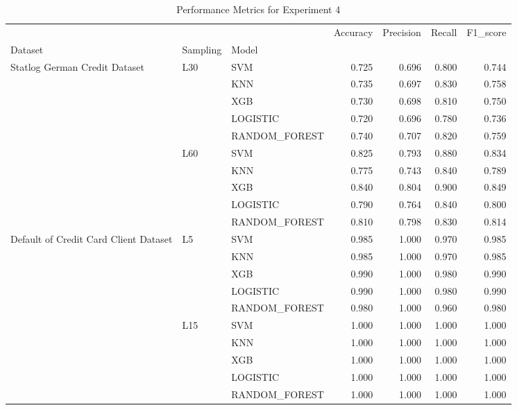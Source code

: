 \begin{table}
\caption{Performance Metrics for Experiment 4}
\label{tab:experiment_4_results}
\begin{tabular}{lllrrrr}
\toprule
 &  &  & Accuracy & Precision & Recall & F1\_score \\
Dataset & Sampling & Model &  &  &  &  \\
\midrule
\multirow[t]{10}{*}{Statlog German Credit Dataset} & \multirow[t]{5}{*}{L30} & SVM & 0.725 & 0.696 & 0.800 & 0.744 \\
 &  & KNN & 0.735 & 0.697 & 0.830 & 0.758 \\
 &  & XGB & 0.730 & 0.698 & 0.810 & 0.750 \\
 &  & LOGISTIC & 0.720 & 0.696 & 0.780 & 0.736 \\
 &  & RANDOM\_FOREST & 0.740 & 0.707 & 0.820 & 0.759 \\
\cline{2-7}
 & \multirow[t]{5}{*}{L60} & SVM & 0.825 & 0.793 & 0.880 & 0.834 \\
 &  & KNN & 0.775 & 0.743 & 0.840 & 0.789 \\
 &  & XGB & 0.840 & 0.804 & 0.900 & 0.849 \\
 &  & LOGISTIC & 0.790 & 0.764 & 0.840 & 0.800 \\
 &  & RANDOM\_FOREST & 0.810 & 0.798 & 0.830 & 0.814 \\
\cline{1-7} \cline{2-7}
\multirow[t]{10}{*}{Default of Credit Card Client Dataset} & \multirow[t]{5}{*}{L5} & SVM & 0.985 & 1.000 & 0.970 & 0.985 \\
 &  & KNN & 0.985 & 1.000 & 0.970 & 0.985 \\
 &  & XGB & 0.990 & 1.000 & 0.980 & 0.990 \\
 &  & LOGISTIC & 0.990 & 1.000 & 0.980 & 0.990 \\
 &  & RANDOM\_FOREST & 0.980 & 1.000 & 0.960 & 0.980 \\
\cline{2-7}
 & \multirow[t]{5}{*}{L15} & SVM & 1.000 & 1.000 & 1.000 & 1.000 \\
 &  & KNN & 1.000 & 1.000 & 1.000 & 1.000 \\
 &  & XGB & 1.000 & 1.000 & 1.000 & 1.000 \\
 &  & LOGISTIC & 1.000 & 1.000 & 1.000 & 1.000 \\
 &  & RANDOM\_FOREST & 1.000 & 1.000 & 1.000 & 1.000 \\
\cline{1-7} \cline{2-7}
\bottomrule
\end{tabular}
\end{table}

